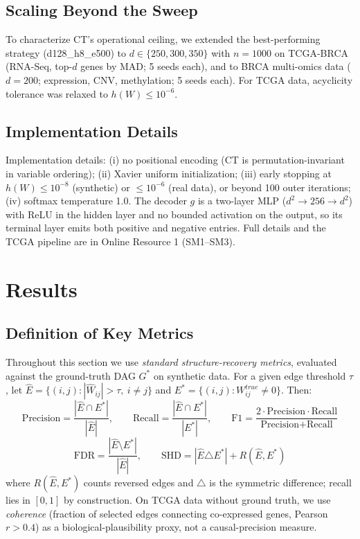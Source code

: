 \documentclass[12pt,a4paper]{article}
\begin{document}
\subsection{Scaling Beyond the Sweep}

To characterize CT's operational ceiling, we extended the best-performing strategy (d128\_h8\_e500) to $d \in \{250, 300, 350\}$ with $n=1000$ on TCGA-BRCA (RNA-Seq, top-$d$ genes by MAD; 5 seeds each), and to BRCA multi-omics data ($d=200$; expression, CNV, methylation; 5 seeds each). For TCGA data, acyclicity tolerance was relaxed to $h(W) \le 10^{-6}$.

\subsection{Implementation Details}

Implementation details: (i) no positional encoding (CT is permutation-invariant in variable ordering); (ii) Xavier uniform initialization; (iii) early stopping at $h(W) \le 10^{-8}$ (synthetic) or $\le 10^{-6}$ (real data), or beyond 100 outer iterations; (iv) softmax temperature 1.0. The decoder $g$ is a two-layer MLP ($d^2 \to 256 \to d^2$) with ReLU in the hidden layer and no bounded activation on the output, so its terminal layer emits both positive and negative entries. Full details and the TCGA pipeline are in Online Resource 1 (SM1--SM3).

\section{Results}

\subsection{Definition of Key Metrics}

Throughout this section we use \emph{standard structure-recovery metrics}, evaluated against the ground-truth DAG $G^{*}$ on synthetic data. For a given edge threshold $\tau$, let $\hat{E} = \{(i,j) : |\hat{W}_{ij}| > \tau,\ i \neq j\}$ and $E^{*} = \{(i,j) : W^{true}_{ij} \neq 0\}$. Then:
\begin{equation}
\text{Precision} = \frac{|\hat{E} \cap E^{*}|}{|\hat{E}|}, \qquad
\text{Recall} = \frac{|\hat{E} \cap E^{*}|}{|E^{*}|}, \qquad
\text{F1} = \frac{2 \cdot \text{Precision} \cdot \text{Recall}}{\text{Precision} + \text{Recall}}
\label{eq:prf}
\end{equation}
\begin{equation}
\text{FDR} = \frac{|\hat{E} \setminus E^{*}|}{|\hat{E}|}, \qquad
\text{SHD} = |\hat{E} \triangle E^{*}| + R(\hat{E}, E^{*})
\label{eq:shd}
\end{equation}
where $R(\hat{E}, E^{*})$ counts reversed edges and $\triangle$ is the symmetric difference; recall lies in $[0,1]$ by construction. On TCGA data without ground truth, we use \emph{coherence} (fraction of selected edges connecting co-expressed genes, Pearson $r>0.4$) as a biological-plausibility proxy, not a causal-precision measure.
\end{document}
